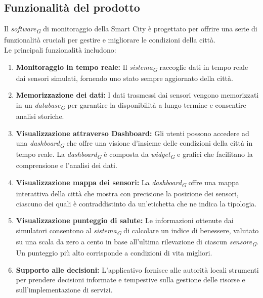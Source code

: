 \subsection{Funzionalità del prodotto}

Il \textit{software}\textsubscript{\textit{G}} di monitoraggio della Smart City è progettato per offrire una serie di funzionalità cruciali per gestire e migliorare le condizioni della città. \\
Le principali funzionalità includono:

\begin{enumerate}
    \item \textbf{Monitoraggio in tempo reale:} Il \textit{sistema}\textsubscript{\textit{G}} raccoglie dati in tempo reale dai sensori simulati, fornendo uno stato sempre aggiornato della città.

    \item \textbf{Memorizzazione dei dati:} I dati trasmessi dai sensori vengono memorizzati in un \textit{database}\textsubscript{\textit{G}} per garantire la disponibilità a lungo termine e consentire analisi storiche.

    \item \textbf{Visualizzazione attraverso Dashboard:} Gli utenti possono accedere ad una \textit{dashboard}\textsubscript{\textit{G}} che offre una visione d’insieme delle condizioni della città in tempo reale. La \textit{dashboard}\textsubscript{\textit{G}} è composta da \textit{widget}\textsubscript{\textit{G}} e grafici che facilitano la comprensione e l'analisi dei dati.
    
    \item \textbf{Visualizzazione mappa dei sensori:} La \textit{dashboard}\textsubscript{\textit{G}} offre una mappa interattiva della città che mostra con precisione la posizione dei sensori, ciascuno dei quali è contraddistinto da un'etichetta che ne indica la tipologia.

    \item \textbf{Visualizzazione punteggio di salute:} Le informazioni ottenute dai simulatori consentono al \textit{sistema}\textsubscript{\textit{G}} di calcolare un indice di benessere, valutato su una scala da zero a cento in base all'ultima rilevazione di ciascun \textit{sensore}\textsubscript{\textit{G}}. Un punteggio più alto corrisponde a condizioni di vita migliori.

    \item \textbf{Supporto alle decisioni:} L'applicativo fornisce alle autorità locali strumenti per prendere decisioni informate e tempestive sulla gestione delle risorse e sull'implementazione di servizi.
    

\end{enumerate}
